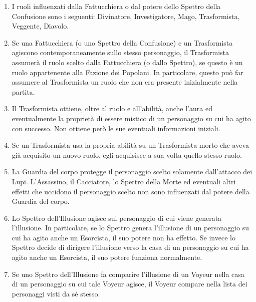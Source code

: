 \documentclass[a4paper,10pt]{article}
\begin{document}
\begin{enumerate}
	\item I ruoli influenzati dalla Fattucchiera o dal potere dello Spettro della Confusione sono i seguenti: Divinatore, Investigatore, Mago, Trasformista, Veggente, Diavolo.
	
	\item Se una Fattucchiera (o uno Spettro della Confusione) e un Trasformista agiscono contemporaneamente sullo stesso personaggio, il Trasformista assumerà il ruolo scelto dalla Fattucchiera (o dallo Spettro), se questo è un ruolo appartenente alla Fazione dei Popolani. In particolare, questo può far assumere al Trasformista un ruolo che non era presente inizialmente nella partita.
	
	\item Il Trasformista ottiene, oltre al ruolo e all'abilità, anche l'aura ed eventualmente la proprietà di essere mistico di un personaggio su cui ha agito con successo. Non ottiene però le sue eventuali informazioni iniziali.
	
	\item Se un Trasformista usa la propria abilità su un Trasformista morto che aveva già acquisito un nuovo ruolo, egli acquisisce a sua volta quello stesso ruolo. %
	
	\item La Guardia del corpo protegge il personaggio scelto solamente dall'attacco dei Lupi. L'Assassino, il Cacciatore, lo Spettro della Morte ed eventuali altri effetti che uccidono il personaggio scelto non sono influenzati dal potere della Guardia del corpo.
	
	\item Lo Spettro dell'Illusione agisce sul personaggio di cui viene generata l'illusione. In particolare, se lo Spettro genera l'illusione di un personaggio su cui ha agito anche un Esorcista, il suo potere non ha effetto. Se invece lo Spettro decide di dirigere l'illusione verso la casa di un personaggio su cui ha agito anche un Esorcista, il suo potere funziona normalmente.
	
	\item Se uno Spettro dell'Illusione fa comparire l'illusione di un Voyeur nella casa di un personaggio su cui tale Voyeur agisce, il Voyeur compare nella lista dei personaggi visti da sé stesso.
	

\end{enumerate}
\end{document}
